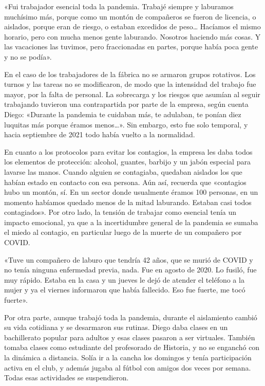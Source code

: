 \begin{refsection}
\begin{gbcita}
«Fui trabajador esencial toda la pandemia. Trabajé siempre y laburamos muchísimo más, porque como un montón de compañeros se fueron de licencia, o aislados, porque eran de riesgo, o estaban excedidos de peso… Hacíamos el mismo horario, pero con mucha menos gente laburando. Nosotros haciendo más cosas. Y las vacaciones las tuvimos, pero fraccionadas en partes, porque había poca gente y no se podía».

\end{gbcita}

En el caso de los trabajadores de la fábrica no se armaron grupos rotativos. Los turnos y las tareas no se modificaron, de modo que la intensidad del trabajo fue mayor, por la falta de personal. La sobrecarga y los riesgos que asumían al seguir trabajando tuvieron una contrapartida por parte de la empresa, según cuenta Diego: «Durante la pandemia te cuidaban más, te adulaban, te ponían diez luquitas más porque éramos menos…». Sin embargo, esto fue solo temporal, y hacia septiembre de 2021 todo había vuelto a la normalidad.

En cuanto a los protocolos para evitar los contagios, la empresa les daba todos los elementos de protección: alcohol, guantes, barbijo y un jabón especial para lavarse las manos. Cuando alguien se contagiaba, quedaban aislados los que habían estado en contacto con esa persona. Aún así, recuerda que «contagios hubo un montón, sí. En un sector donde usualmente éramos 100 personas, en un momento habíamos quedado menos de la mitad laburando. Estaban casi todos contagiados». Por otro lado, la tensión de trabajar como esencial tenía un impacto emocional, ya que a la incertidumbre general de la pandemia se sumaba el miedo al contagio, en particular luego de la muerte de un compañero por COVID.


\begin{gbcita}
«Tuve un compañero de laburo que tendría 42 años, que se murió de COVID y no tenía ninguna enfermedad previa, nada. Fue en agosto de 2020. Lo fusiló, fue muy rápido. Estaba en la casa y un jueves le dejó de atender el teléfono a la mujer y ya el viernes informaron que había fallecido. Eso fue fuerte, me tocó fuerte».

\end{gbcita}

Por otra parte, aunque trabajó toda la pandemia, durante el aislamiento cambió su vida cotidiana y se desarmaron sus rutinas. Diego daba clases en un bachillerato popular para adultos y esas clases pasaron a ser virtuales. También tomaba clases como estudiante del profesorado de Historia, y no se enganchó con la dinámica a distancia. Solía ir a la cancha los domingos y tenía participación activa en el club, y además jugaba al fútbol con amigos dos veces por semana. Todas esas actividades se suspendieron.



\end{refsection}
